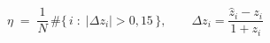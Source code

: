 \documentclass[border=14pt]{standalone}
\begin{document}
{\LARGE $\eta \;=\; \dfrac{1}{N}\,\#\bigl\{\, i \;:\; |\Delta z_i| > 0{,}15 \,\bigr\}, \qquad \Delta z_i = \dfrac{\hat{z}_i - z_i}{1 + z_i}$}
\end{document}
